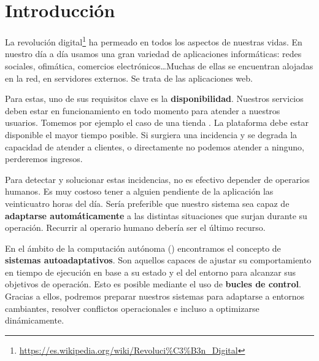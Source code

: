 
\chapter{Introducción}
\label{chap:introduccion}

La revolución digital\footnote{\url{https://es.wikipedia.org/wiki/Revoluci\%C3\%B3n_Digital}} ha permeado en todos los aspectos de nuestras vidas. En nuestro día a día usamos una gran variedad de aplicaciones informáticas: redes sociales, ofimática, comercios electrónicos\dots Muchas de ellas se encuentran alojadas en la red, en servidores externos. Se trata de las aplicaciones web.

Para estas, uno de sus requisitos clave es la \textbf{disponibilidad}. \cite{birmanAddingHighAvailability2004} Nuestros servicios deben estar en funcionamiento en todo momento para atender a nuestros usuarios. Tomemos por ejemplo el caso de una tienda . La plataforma debe estar disponible el mayor tiempo posible. Si surgiera una incidencia y se degrada la capacidad de atender a clientes, o directamente no podemos atender a ninguno, perderemos ingresos.

Para detectar y solucionar estas incidencias, no es efectivo depender de operarios humanos. \cite{ibmcorporationArchitecturalBlueprintAutonomic2006} Es muy costoso tener a alguien pendiente de la aplicación las veinticuatro horas del día. Sería preferible que nuestro sistema sea capaz de \textbf{adaptarse automáticamente} a las distintas situaciones que surjan durante su operación. Recurrir al operario humano debería ser el último recurso.

En el ámbito de la computación autónoma () encontramos el concepto de \textbf{sistemas autoadaptativos}. Son aquellos capaces de ajustar su comportamiento en tiempo de ejecución en base a su estado y el del entorno para alcanzar sus objetivos de operación. \cite{ibmcorporationArchitecturalBlueprintAutonomic2006} Esto es posible mediante el uso de \textbf{bucles de control}. \cite{brunEngineeringSelfAdaptiveSystems2009} Gracias a ellos, podremos preparar nuestros sistemas para adaptarse a entornos cambiantes, resolver conflictos operacionales e incluso a optimizarse dinámicamente.

